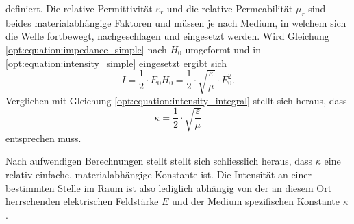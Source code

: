 definiert.
Die relative Permittivität $\varepsilon_r$ und die relative Permeabilität $\mu_r$ sind beides materialabhängige Faktoren und müssen je nach Medium, in welchem sich die Welle fortbewegt, nachgeschlagen und eingesetzt werden.
Wird Gleichung \eqref{opt:equation:impedance_simple} nach $H_0$ umgeformt und in \eqref{opt:equation:intensity_simple} eingesetzt ergibt sich
\begin{equation*}
I
=
\frac{1}{2} \cdot E_0 H_0
=
\frac{1}{2} \cdot \sqrt{\frac{\varepsilon}{\mu}} \cdot E_0^2
.
\end{equation*}
Verglichen mit Gleichung \eqref{opt:equation:intensity_integral} stellt sich heraus, dass
\begin{equation*}
\kappa
=
\frac{1}{2} \cdot \sqrt{\frac{\varepsilon}{\mu}}
\end{equation*}
entsprechen muss.

Nach aufwendigen Berechnungen stellt stellt sich schliesslich heraus, dass $\kappa$ eine relativ einfache, materialabhängige Konstante ist.
Die Intensität an einer bestimmten Stelle im Raum ist also lediglich abhängig von der an diesem Ort herrschenden elektrischen Feldstärke $E$ und der Medium spezifischen Konstante $\kappa$.



